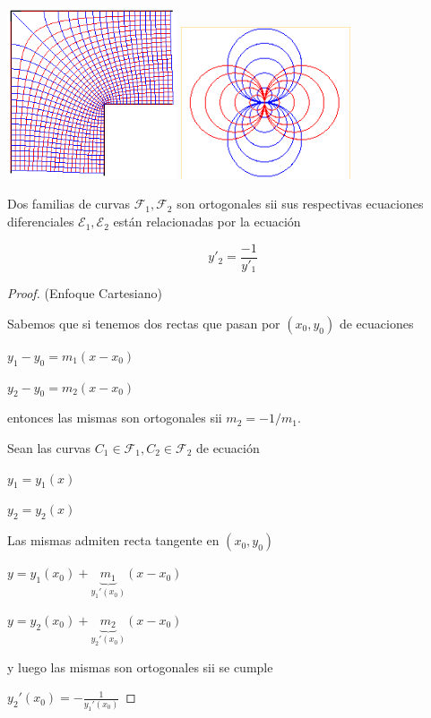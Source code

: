 \begin{center}
\includegraphics[width=5cm]{images/04_analisis2/flias_ortogonales3.png}
\includegraphics[width=5cm]{images/04_analisis2/flias_ortogonales6.png}
\end{center}

\begin{proposition}

Dos familias de curvas $\mathcal{F}_1, \mathcal{F}_2$ son ortogonales sii sus respectivas ecuaciones diferenciales $\mathcal{E}_1, \mathcal{E}_2$ están relacionadas por la ecuación

$$ y'_2 = \frac{-1}{y'_1}$$

\end{proposition}

\begin{proof} (Enfoque Cartesiano)

Sabemos que si tenemos dos rectas que pasan por $(x_0, y_0)$ de ecuaciones 

$ y_1 - y_0 = m_1 (x-x_0)$

$ y_2 - y_0 = m_2 (x-x_0)$

entonces las mismas son ortogonales sii $m_2 = -1/m_1$.

Sean las curvas $C_1 \in \mathcal{F}_1, C_2 \in \mathcal{F}_2$ de ecuación

$ y_1 = y_1(x)$

$ y_2 = y_2(x)$

Las mismas admiten recta tangente en $(x_0, y_0)$

$ y = y_1(x_0) + \underbrace{m_1}_{y_1'(x_0)} (x-x_0)$ 

$ y = y_2(x_0) + \underbrace{m_2}_{y_2'(x_0)} (x-x_0)$ 

y luego las mismas son ortogonales sii se cumple

$ y_2'(x_0) = - \frac{1}{y_1'(x_0)}$
\end{proof}

